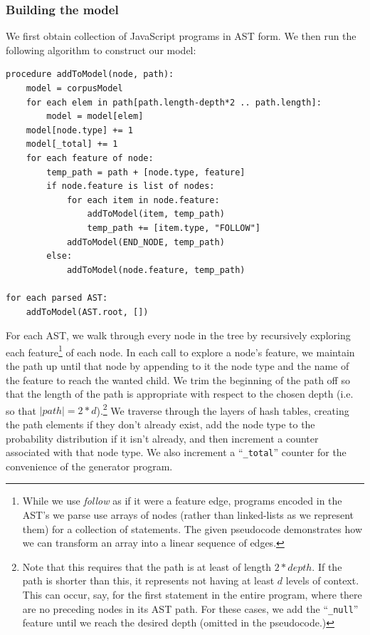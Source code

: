 \documentclass{article}
\begin{document}
\subsubsection{Building the model}

We first obtain collection of JavaScript programs in AST form. We then run the following algorithm to construct our model:

\begin{verbatim}
procedure addToModel(node, path):
    model = corpusModel
    for each elem in path[path.length-depth*2 .. path.length]:
        model = model[elem]
    model[node.type] += 1
    model[_total] += 1
    for each feature of node:
        temp_path = path + [node.type, feature]
        if node.feature is list of nodes:
            for each item in node.feature:
                addToModel(item, temp_path)
                temp_path += [item.type, "FOLLOW"]
            addToModel(END_NODE, temp_path)
        else:
            addToModel(node.feature, temp_path)

for each parsed AST:
    addToModel(AST.root, [])
\end{verbatim}

For each AST, we walk through every node in the tree by recursively exploring each feature\footnote{While we use \emph{follow} as if it were a feature edge, programs encoded in the AST's we parse use arrays of nodes (rather than linked-lists as we represent them) for a collection of statements. The given pseudocode demonstrates how we can transform an array into a linear sequence of edges.} of each node. In each call to explore a node's feature, we maintain the path up until that node by appending to it the node type and the name of the feature to reach the wanted child. We trim the beginning of the path off so that the length of the path is appropriate with respect to the chosen depth (i.e. so that $|path| = 2*d$).\footnote{Note that this requires that the path is at least of length $2*depth$. If the path is shorter than this, it represents not having at least $d$ levels of context. This can occur, say, for the first statement in the entire program, where there are no preceding nodes in its AST path. For these cases, we add the ``{\tt \_null}'' feature until we reach the desired depth (omitted in the pseudocode.)} We traverse through the layers of hash tables, creating the path elements if they don't already exist, add the node type to the probability distribution if it isn't already, and then increment a counter associated with that node type. We also increment a ``{\tt \_total}'' counter for the convenience of the generator program.
\end{document}

